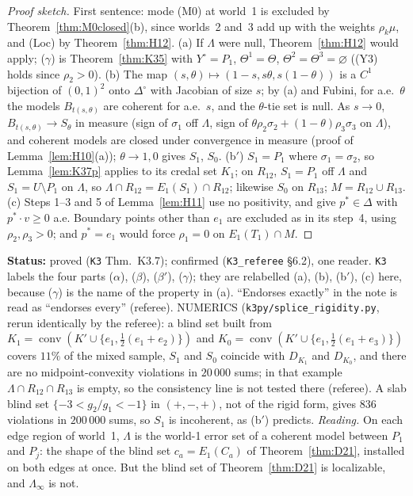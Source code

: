 \documentclass[11pt]{article}
\theoremstyle{definition}
\theoremstyle{remark}
\newcommand{\Di}{\Delta^{\circ}}
\newcommand{\co}{\operatorname{conv}}
\newcommand{\src}[1]{\texttt{#1}}
\newcommand{\status}[1]{\par\smallskip\noindent\textbf{Status:} #1\par\smallskip}
\begin{document}
\begin{proof}[Proof sketch]
First sentence: mode (M0) at world~1 is excluded by Theorem~\ref{thm:M0closed}(b), since worlds~2 and~3 add up with the weights $\rho_k\mu$, and (Loc) by Theorem~\ref{thm:H12}. (a) If $\Lambda$ were null, Theorem~\ref{thm:H12} would apply; ($\gamma$) is Theorem~\ref{thm:K35} with $Y^\circ=P_1$, $\Theta^1=\Theta$, $\Theta^2=\Theta^3=\varnothing$ ((Y3) holds since $\rho_2>0$). (b) The map $(s,\theta)\mapsto(1-s,s\theta,s(1-\theta))$ is a $C^1$ bijection of $(0,1)^2$ onto $\Di$ with Jacobian of size $s$; by (a) and Fubini, for a.e.\ $\theta$ the models $B_{t(s,\theta)}$ are coherent for a.e.\ $s$, and the $\theta$-tie set is null. As $s\to0$, $B_{t(s,\theta)}\to S_\theta$ in measure (sign of $\sigma_1$ off $\Lambda$, sign of $\theta\rho_2\sigma_2+(1-\theta)\rho_3\sigma_3$ on $\Lambda$), and coherent models are closed under convergence in measure (proof of Lemma~\ref{lem:H10}(a)); $\theta\to1,0$ gives $S_1$, $S_0$. (b$'$) $S_1=P_1$ where $\sigma_1=\sigma_2$, so Lemma~\ref{lem:K37p} applies to its credal set $K_1$; on $R_{12}$, $S_1=P_1$ off $\Lambda$ and $S_1=U\setminus P_1$ on $\Lambda$, so $\Lambda\cap R_{12}=E_1(S_1)\cap R_{12}$; likewise $S_0$ on $R_{13}$; $M=R_{12}\cup R_{13}$. (c) Steps 1--3 and 5 of Lemma~\ref{lem:H11} use no positivity, and give $p^*\in\Delta$ with $p^*\cdot v\ge0$ a.e. Boundary points other than $e_1$ are excluded as in its step~4, using $\rho_2,\rho_3>0$; and $p^*=e_1$ would force $\rho_1=0$ on $E_1(T_1)\cap M$.
\end{proof}
\status{proved (\src{K3} Thm.~K3.7); confirmed (\src{K3\_referee} \S6.2), one reader. \src{K3} labels the four parts ($\alpha$), ($\beta$), ($\beta'$), ($\gamma$); they are relabelled (a), (b), (b$'$), (c) here, because ($\gamma$) is the name of the property in (a). ``Endorses exactly'' in the note is read as ``endorses every'' (referee). NUMERICS (\src{k3py/splice\_rigidity.py}, rerun identically by the referee): a blind set built from $K_1=\co(K'\cup\{e_1,\tfrac12(e_1+e_2)\})$ and $K_0=\co(K'\cup\{e_1,\tfrac12(e_1+e_3)\})$ covers $11\%$ of the mixed sample, $S_1$ and $S_0$ coincide with $D_{K_1}$ and $D_{K_0}$, and there are no midpoint-convexity violations in $20\,000$ sums; in that example $\Lambda\cap R_{12}\cap R_{13}$ is empty, so the consistency line is not tested there (referee). A slab blind set $\{-3<g_2/g_1<-1\}$ in $(+,-,+)$, not of the rigid form, gives 836 violations in $200\,000$ sums, so $S_1$ is incoherent, as (b$'$) predicts. \emph{Reading.} On each edge region of world~1, $\Lambda$ is the world-1 error set of a coherent model between $P_1$ and $P_j$: the shape of the blind set $c_a=E_1(C_a)$ of Theorem~\ref{thm:D21}, installed on both edges at once. But the blind set of Theorem~\ref{thm:D21} is localizable, and $\Lambda_\infty$ is not.}
\end{document}
